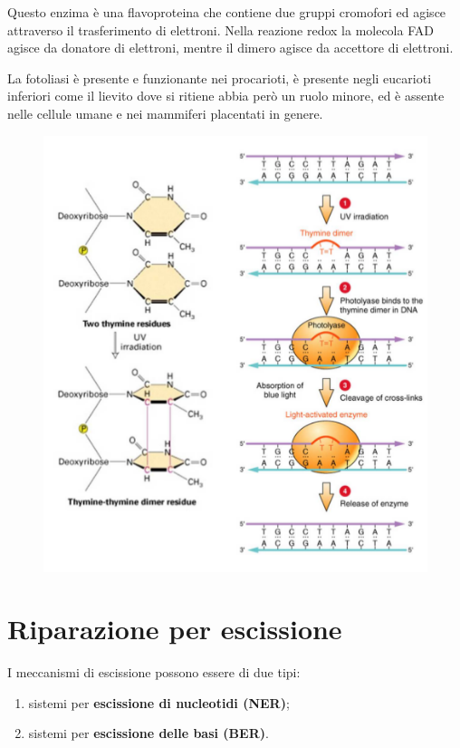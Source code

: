 \documentclass[11pt]{book}
\begin{document}
Questo enzima è una flavoproteina che contiene due gruppi cromofori ed
agisce attraverso il trasferimento di elettroni. Nella reazione redox la
molecola FAD agisce da donatore di elettroni, mentre il dimero agisce da
accettore di elettroni.

La fotoliasi è presente e funzionante nei procarioti, è presente negli
eucarioti inferiori come il lievito dove si ritiene abbia però un ruolo
minore, ed è assente nelle cellule umane e nei mammiferi placentati in
genere.

\begin{figure}[htp]
\centering
\includegraphics[scale=0.34]{img/23_Fotoliasi.png}
\caption{}
\label{fotoliasi}
\end{figure}

\clearpage
\section{Riparazione per
escissione}\label{riparazione-per-escissione}

I meccanismi di escissione possono essere di due tipi:

\begin{enumerate}
\def\labelenumi{\arabic{enumi}.}
\itemsep1pt\parskip0pt
\item
  sistemi per \textbf{escissione di nucleotidi (NER)};
\item
  sistemi per \textbf{escissione delle basi (BER)}.
\end{enumerate}
\end{document}
